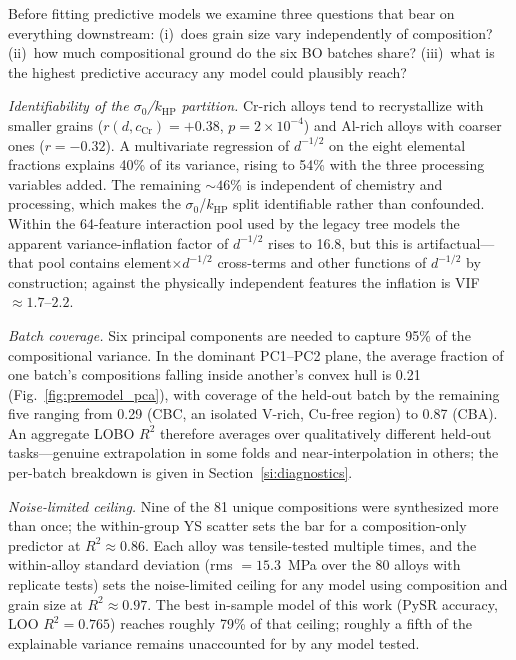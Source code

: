 \documentclass[11pt]{article}
\begin{document}
Before fitting predictive models we examine three questions that bear on everything downstream: (i)~does grain size vary independently of composition? (ii)~how much compositional ground do the six BO batches share? (iii)~what is the highest predictive accuracy any model could plausibly reach?

\emph{Identifiability of the $\sigma_0$/$k_\text{HP}$ partition.} Cr-rich alloys tend to recrystallize with smaller grains ($r(d, c_\text{Cr}) = +0.38$, $p = 2\times10^{-4}$) and Al-rich alloys with coarser ones ($r = -0.32$). A multivariate regression of $d^{-1/2}$ on the eight elemental fractions explains 40\% of its variance, rising to 54\% with the three processing variables added. The remaining ${\sim}46\%$ is independent of chemistry and processing, which makes the $\sigma_0$/$k_\text{HP}$ split identifiable rather than confounded. Within the 64-feature interaction pool used by the legacy tree models the apparent variance-inflation factor of $d^{-1/2}$ rises to 16.8, but this is artifactual---that pool contains element$\times d^{-1/2}$ cross-terms and other functions of $d^{-1/2}$ by construction; against the physically independent features the inflation is VIF $\approx 1.7$--$2.2$.

\emph{Batch coverage.} Six principal components are needed to capture 95\% of the compositional variance. In the dominant PC1--PC2 plane, the average fraction of one batch's compositions falling inside another's convex hull is 0.21 (Fig.~\ref{fig:premodel_pca}), with coverage of the held-out batch by the remaining five ranging from 0.29 (CBC, an isolated V-rich, Cu-free region) to 0.87 (CBA). An aggregate LOBO $R^2$ therefore averages over qualitatively different held-out tasks---genuine extrapolation in some folds and near-interpolation in others; the per-batch breakdown is given in Section~\ref{si:diagnostics}.

\emph{Noise-limited ceiling.} Nine of the 81 unique compositions were synthesized more than once; the within-group YS scatter sets the bar for a composition-only predictor at $R^2 \approx 0.86$. Each alloy was tensile-tested multiple times, and the within-alloy standard deviation (rms $= 15.3$~\si{MPa} over the 80 alloys with replicate tests) sets the noise-limited ceiling for any model using composition and grain size at $R^2 \approx 0.97$. The best in-sample model of this work (PySR accuracy, LOO $R^2 = 0.765$) reaches roughly 79\% of that ceiling; roughly a fifth of the explainable variance remains unaccounted for by any model tested.
\end{document}
